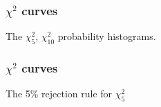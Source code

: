 \documentclass[handout]{beamer}
\begin{document}


   \begin{frame}
   \frametitle{$\chi^2$ curves}
   \begin{center}
   \end{center}
   The $\chi^2_5$, $\chi^2_{10}$ probability histograms.
   \end{frame}



   \begin{frame}
   \frametitle{$\chi^2$ curves}
   \begin{center}
   \end{center}
   The 5\% rejection rule for $\chi^2_5$
   \end{frame}
\end{document}
